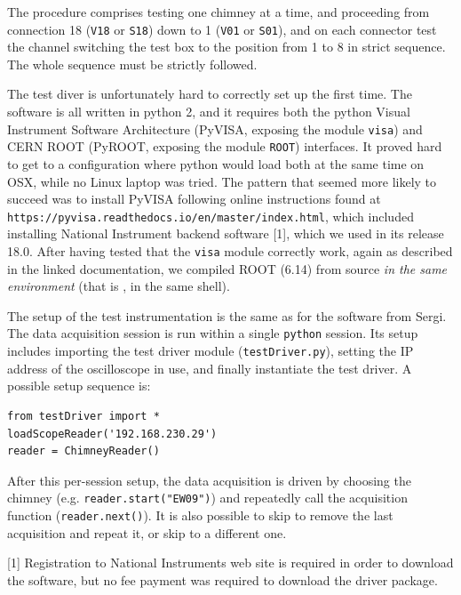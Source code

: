 The procedure comprises testing one chimney at a time, and proceeding
from connection 18 (\texttt{V18} or \texttt{S18}) down to 1
(\texttt{V01} or \texttt{S01}), and on each connector test the channel
switching the test box to the position from 1 to 8 in strict sequence.
The whole sequence must be strictly followed.

The test diver is unfortunately hard to correctly set up the first time.
The software is all written in python 2, and it requires both the python
Visual Instrument Software Architecture (PyVISA, exposing the module
\texttt{visa}) and CERN ROOT (PyROOT, exposing the module \texttt{ROOT})
interfaces. It proved hard to get to a configuration where python would
load both at the same time on OSX, while no Linux laptop was tried. The
pattern that seemed more likely to succeed was to install PyVISA
following online instructions found at
\texttt{https://pyvisa.readthedocs.io/en/master/index.html}, which
included installing National Instrument backend software {[}1{]}, which
we used in its release 18.0. After having tested that the \texttt{visa}
module correctly work, again as described in the linked documentation,
we compiled ROOT (6.14) from source \emph{in the same environment} (that
is , in the same shell).

The setup of the test instrumentation is the same as for the software
from Sergi. The data acquisition session is run within a single
\texttt{python} session. Its setup includes importing the test driver
module (\texttt{testDriver.py}), setting the IP address of the
oscilloscope in use, and finally instantiate the test driver. A possible
setup sequence is:

\begin{verbatim}
from testDriver import *
loadScopeReader('192.168.230.29')
reader = ChimneyReader()
\end{verbatim}

After this per-session setup, the data acquisition is driven by choosing
the chimney (e.g. \texttt{reader.start("EW09")}) and repeatedly call the
acquisition function (\texttt{reader.next()}). It is also possible to
skip to remove the last acquisition and repeat it, or skip to a
different one.

{[}1{]} Registration to National Instruments web site is required in
order to download the software, but no fee payment was required to
download the driver package.
